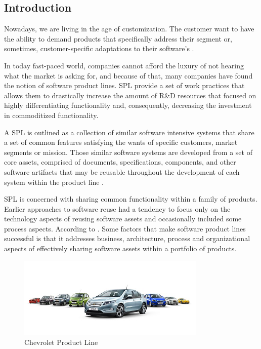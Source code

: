 \subsection{Introduction}
Nowadays, we are living in the age of customization. The customer want to have the ability to demand products that specifically address their segment or, sometimes, customer-specific adaptations to their software's \citep{rafael2013systems}.  

In today fast-paced world, companies cannot afford the luxury of not hearing what the market is asking for, and because of that, many companies have found the notion of software product lines. \acf{SPL} provide a set of work practices that allows them to drastically increase the amount of R\&D resources that focused on highly differentiating functionality and, consequently, decreasing the investment in commoditized functionality. 

A \ac{SPL} is outlined as a collection of similar software intensive systems that share a set of common features satisfying the wants of specific customers, market segments or mission. Those similar software systems are developed from a set of core assets, comprised of documents, specifications, components, and other software artifacts that may be reusable throughout the development of each system within the product line \citep{rafael2013systems}.

 \acf{SPL} is concerned with sharing common functionality within a family of products. Earlier approaches to software reuse had a tendency to focus only on the technology aspects of reusing software assets and occasionally included some process aspects. According to \citep{rafael2013systems}. Some factors that make software product lines successful is that it addresses business, architecture, process and organizational aspects of effectively sharing software assets within a portfolio of products. 


\begin{figure}[htp]
\begin{center}
  \includegraphics[width=9cm]{chapters/background/img/chev-line.jpg}
  \caption[Chevrolet Product Line]{Chevrolet Product Line}
  \label{fg:chev-line}
\end{center}
\end{figure}


